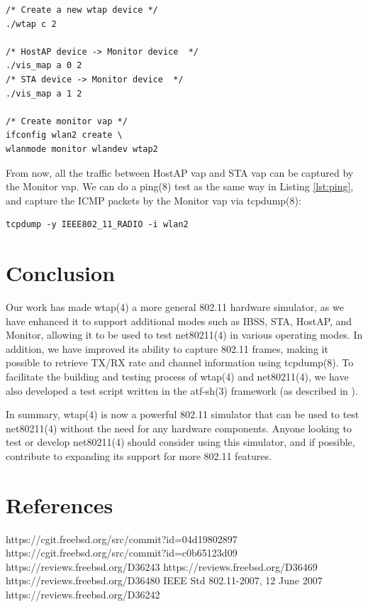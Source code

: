 \documentclass[conference]{IEEEtran}
\begin{document}
\begin{lstlisting}
/* Create a new wtap device */
./wtap c 2

/* HostAP device -> Monitor device  */
./vis_map a 0 2
/* STA device -> Monitor device  */
./vis_map a 1 2

/* Create monitor vap */
ifconfig wlan2 create \
wlanmode monitor wlandev wtap2
\end{lstlisting}

From now, all the traffic between HostAP vap and STA vap can be captured by the Monitor vap. We can do a ping(8) test as the same way in Listing \ref{lst:ping}, and capture the ICMP packets by the Monitor vap via tcpdump(8):

\begin{lstlisting}
tcpdump -y IEEE802_11_RADIO -i wlan2
\end{lstlisting}

\section{Conclusion}
Our work has made wtap(4) a more general 802.11 hardware simulator, as we have enhanced it to support additional modes such as IBSS, STA, HostAP, and Monitor, allowing it to be used to test net80211(4) in various operating modes. In addition, we have improved its ability to capture 802.11 frames, making it possible to retrieve TX/RX rate and channel information using tcpdump(8). To facilitate the building and testing process of wtap(4) and net80211(4), we have also developed a test script written in the atf-sh(3) framework (as described in \cite{commit:atf}).

In summary, wtap(4) is now a powerful 802.11 simulator that can be used to test net80211(4) without the need for any hardware components. Anyone looking to test or develop net80211(4) should consider using this simulator, and if possible, contribute to expanding its support for more 802.11 features.


\section{References}
\begin{thebibliography}{00}
 https://cgit.freebsd.org/src/commit?id=04d19802897
\bibitem{commit:adhoc} https://cgit.freebsd.org/src/commit?id=c0b65123d09
\bibitem{commit:hostap} https://reviews.freebsd.org/D36243
 https://reviews.freebsd.org/D36469
 https://reviews.freebsd.org/D36480
 IEEE Std 802.11-2007, 12 June 2007
 https://reviews.freebsd.org/D36242
\end{thebibliography}
\vspace{12pt}
\end{document}
